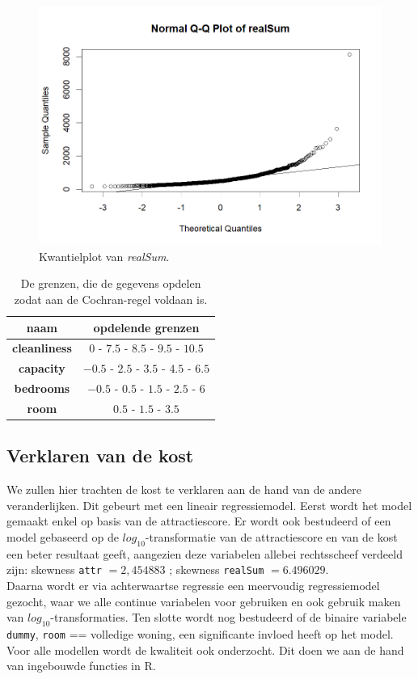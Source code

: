 \documentclass[a4paper]{kulakarticle}
\begin{document}
	\begin{figure}
		\centering
		\includegraphics[width=0.7\linewidth]{Figuren/qqplotvrealSum}
		\caption{Kwantielplot van \textit{realSum}.}
		\label{fig:qqplotvrealsum}
	\end{figure}

	\begin{table}[h]
		\centering
			\begin{tabular}{c|c}
			\centering
			naam& opdelende grenzen\\
			\hline
			\textbf{cleanliness} & $ 0 $ - $ 7.5 $ - $ 8.5$ - $ 9.5 $ - $ 10.5$ \\
			\textbf{capacity}& $-0.5$ - $2.5$ - $3.5$ - $4.5$ - $6.5$\\
			\textbf{bedrooms}& $-0.5$ - $0.5$ - $1.5$ - $2.5$ - $6$\\
			\textbf{room} & $0.5$ - $1.5$ - $3.5$\\
			\end{tabular}
			\caption{De grenzen, die de gegevens opdelen zodat aan de Cochran-regel voldaan is.}
			\label{tab:grenzen}
	\end{table}
	\subsection{Verklaren van de kost}
	
	We zullen hier trachten de kost te verklaren aan de hand van de andere veranderlijken. Dit gebeurt met een lineair regressiemodel. Eerst wordt het model gemaakt enkel op basis van de attractiescore. Er wordt ook bestudeerd of een model gebaseerd op de $log_{10}$-transformatie van de attractiescore en van de kost een beter resultaat geeft, aangezien deze variabelen allebei rechtsscheef verdeeld zijn: skewness \verb|attr| $=2,454883$ ; skewness \verb|realSum| $=6.496029$.\\
	Daarna wordt er via achterwaartse regressie een meervoudig regressiemodel gezocht, waar we alle continue variabelen voor gebruiken en ook gebruik maken van  $log_{10}$-transformaties. Ten slotte wordt nog bestudeerd of de binaire variabele \verb|dummy|, \verb|room| == volledige woning, een significante invloed heeft op het model. Voor alle modellen wordt de kwaliteit ook onderzocht. Dit doen we aan de hand van ingebouwde functies in R. %
	
\end{document}
